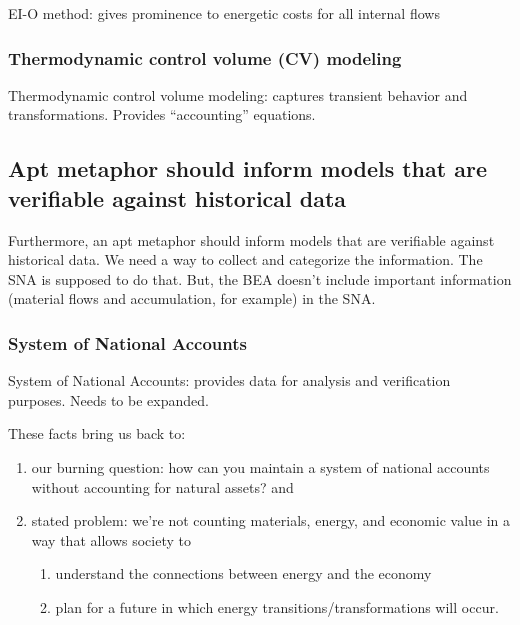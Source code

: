EI-O method: gives prominence to energetic costs for all internal flows

\subsubsection{Thermodynamic control volume (CV) modeling}
\label{sec:CV_modeling}

Thermodynamic control volume modeling: captures transient behavior 
and transformations.  
Provides ``accounting'' equations.

\subsection{Apt metaphor should inform models that are verifiable against historical data}
\label{sec:historically_verifiable}

Furthermore, an apt metaphor should inform models that are verifiable against historical data. We need a way to collect and categorize the information. The SNA is supposed to do that. But, the BEA doesn’t include important information (material flows and accumulation, for example) in the SNA. 

\subsubsection{System of National Accounts}
\label{sec:national_accounts}

System of National Accounts: provides data for analysis and verification purposes.  
Needs to be expanded.

These facts bring us back to:
\begin{enumerate}
	\item our burning question: how can you maintain a system of national accounts without accounting for natural assets? and
	\item stated problem: we're not counting materials, energy, and economic value in a way that allows society to
				\begin{enumerate}
					\item understand the connections between energy and the economy
					\item plan for a future in which energy transitions/transformations will occur.
				\end{enumerate}
\end{enumerate}


